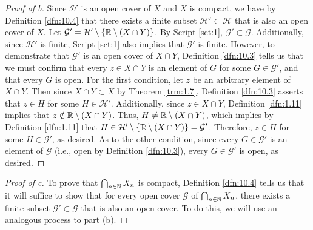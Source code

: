 \documentclass[../main.tex]{subfiles}
\begin{document}
\begin{enumerate}
\begin{proof}[Proof of b]
        Since $\mathcal{H}$ is an open cover of $X$ and $X$ is compact, we have by Definition \ref{dfn:10.4} that there exists a finite subset $\mathcal{H}'\subset\mathcal{H}$ that is also an open cover of $X$. Let $\mathcal{G}'=\mathcal{H}'\setminus\{\mathbb{R}\setminus(X\cap Y)\}$. By Script \ref{sct:1}, $\mathcal{G}'\subset\mathcal{G}$. Additionally, since $\mathcal{H}'$ is finite, Script \ref{sct:1} also implies that $\mathcal{G}'$ is finite. However, to demonstrate that $\mathcal{G}'$ is an open cover of $X\cap Y$, Definition \ref{dfn:10.3} tells us that we must confirm that every $z\in X\cap Y$ is an element of $G$ for some $G\in\mathcal{G}'$, and that every $G$ is open. For the first condition, let $z$ be an arbitrary element of $X\cap Y$. Then since $X\cap Y\subset X$ by Theorem \ref{trm:1.7}, Definition \ref{dfn:10.3} asserts that $z\in H$ for some $H\in\mathcal{H}'$. Additionally, since $z\in X\cap Y$, Definition \ref{dfn:1.11} implies that $z\notin\mathbb{R}\setminus(X\cap Y)$. Thus, $H\neq\mathbb{R}\setminus(X\cap Y)$, which implies by Definition \ref{dfn:1.11} that $H\in\mathcal{H}'\setminus\{\mathbb{R}\setminus(X\cap Y)\}=\mathcal{G}'$. Therefore, $z\in H$ for some $H\in\mathcal{G}'$, as desired. As to the other condition, since every $G\in\mathcal{G}'$ is an element of $\mathcal{G}$ (i.e., open by Definition \ref{dfn:10.3}), every $G\in\mathcal{G}'$ is open, as desired.
    \end{proof}
    \begin{proof}[Proof of c]
        To prove that $\bigcap_{n\in\mathbb{N}}X_n$ is compact, Definition \ref{dfn:10.4} tells us that it will suffice to show that for every open cover $\mathcal{G}$ of $\bigcap_{n\in\mathbb{N}}X_n$, there exists a finite subset $\mathcal{G}'\subset\mathcal{G}$ that is also an open cover. To do this, we will use an analogous process to part (b).\par

\end{proof}
\end{enumerate}
\end{document}
